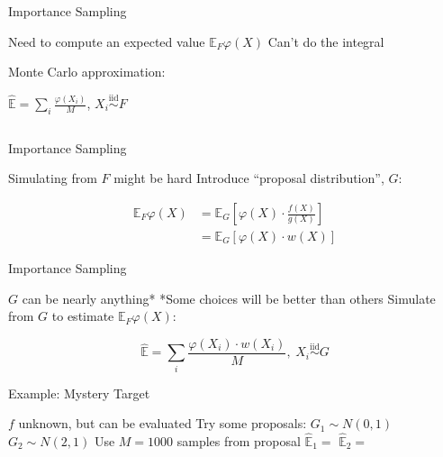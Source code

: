 \documentclass[14pt]{beamer}
\newcommand{\bE}{\mathbb{E}}
\begin{document}
\begin{frame}{Importance Sampling}
    \begin{outline}
        \1 Need to compute an expected value
            \2 $\bE_F \varphi(X)$
        \1 Can't do the integral \newline

        \1 Monte Carlo approximation:

        \1 $\hat{\bE} = \sum_i \frac{\varphi(X_i)}{M}$, $X_i \overset{\mathrm{iid}}{\sim} F$
    \end{outline}
    \begin{equation*}
    \end{equation*}
\end{frame}

\begin{frame}{Importance Sampling}
    \begin{outline}
        \1 Simulating from $F$ might be hard \newline
        \1 Introduce ``proposal distribution'', $G$:
    \end{outline}
    \begin{align*}
        \bE_F \varphi(X) &=  \bE_G \left[ \varphi(X) \cdot \frac{f(X)}{g(X)} \right] \\
        &=  \bE_G \left[ \varphi(X) \cdot w(X) \right]
    \end{align*}
\end{frame}

\begin{frame}{Importance Sampling}
    \begin{outline}
        \1 $G$ can be nearly anything*
            \2 *Some choices will be better than others \newline
        \1 Simulate from $G$ to estimate $\bE_F \varphi(X)$:
    \end{outline}  
    \begin{equation*}
        \hat{\bE} = \sum_i \frac{\varphi(X_i) \cdot w(X_i)}{M} \mathrm{,} \hspace{3pt} X_i \overset{\mathrm{iid}}{\sim} G
    \end{equation*}  
\end{frame}

\begin{frame}{Example: Mystery Target}
    \begin{outline}
        \1 $f$ unknown, but can be evaluated \newline
        \1 Try some proposals:
            \2 $G_1 \sim N(0,1)$
            \2 $G_2 \sim N(2,1)$ \newline
        \1 Use $M=1000$ samples from proposal
            \2 $\hat{\bE}_1 = $
            \2 $\hat{\bE}_2 = $
    \end{outline}    
\end{frame}
\end{document}
